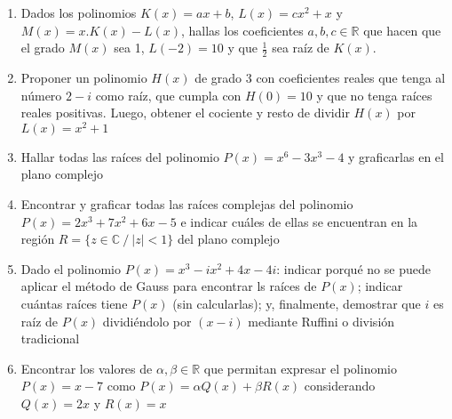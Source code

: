 \documentclass[a4paper]{article}
\newcommand{\df}[2]{\displaystyle\frac{#1}{#2}}
\begin{document}
\begin{enumerate}
\begin{enumerate} [label=(\alph*)]
		\item Dados los polinomios $K(x)=ax+b$, $L(x)=cx^2+x$ y $M(x)=x.K(x)-L(x)$, hallas los coeficientes $a,b,c \in \mathbb{R}$ que hacen que el grado $M(x)$ sea 1, $L(-2)=10$ y que $\df{1}{2}$ sea raíz de $K(x)$.

		\item Proponer un polinomio $H(x)$ de grado 3 con coeficientes reales que tenga al número $2-i$ como raíz, que cumpla con $H(0)=10$ y que no tenga raíces reales positivas. Luego, obtener el cociente y resto de dividir $H(x)$ por $L(x)=x^2+1$

		\item Hallar todas las raíces del polinomio $P(x)=x^6-3x^3-4$ y graficarlas en el plano complejo

		\item Encontrar y graficar todas las raíces complejas del polinomio $P(x)=2x^3+7x^2+6x-5$ e indicar cuáles de ellas se encuentran en la región $R=\{ z \in \mathbb{C} ~/~ |z|<1 \}$ del plano complejo

		\item Dado el polinomio $P(x)=x^3-ix^2+4x-4i$: indicar porqué no se puede aplicar el método de Gauss para encontrar ls raíces de $P(x)$; indicar cuántas raíces tiene $P(x)$ (sin calcularlas); y, finalmente, demostrar que $i$ es raíz de $P(x)$ dividiéndolo por $(x-i)$ mediante Ruffini o división tradicional

		\item Encontrar los valores de $\alpha, \beta \in \mathbb{R}$ que permitan expresar el polinomio $P(x)=x-7$ como $P(x)=\alpha Q(x)+\beta R(x)$ considerando $Q(x)=2x$ y $R(x)=x$

	\end{enumerate}


\end{enumerate}
\end{document}
